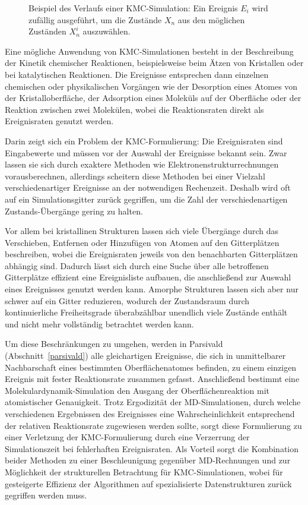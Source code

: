 \begin{figure}
  \centering

  \def\svgwidth{14cm}
  

  \caption[KMC-Baum]{Beispiel des Verlaufs einer KMC-Simulation:
    Ein Ereignis $E_i$ wird zufällig ausgeführt, um die Zustände $X_n$ aus den möglichen Zuständen $X_n^i$ auszuwählen.
  }
  \label{fig:kmctree}
\end{figure}

Eine mögliche Anwendung von KMC-Simulationen besteht in der Beschreibung der Kinetik chemischer Reaktionen, beispielsweise beim Ätzen von Kristallen\cite{gosalvez_atomistic_2008} oder bei katalytischen Reaktionen\cite{stamatakis_unraveling_2012}.
Die Ereignisse entsprechen dann einzelnen chemischen oder physikalischen Vorgängen wie der Desorption eines Atomes von der Kristalloberfläche, der Adsorption eines Moleküls auf der Oberfläche oder der Reaktion zwischen zwei Molekülen, wobei die Reaktionsraten direkt als Ereignisraten genutzt werden.

Darin zeigt sich ein Problem der KMC-Formulierung:
Die Ereignisraten sind Eingabewerte und müssen vor der Auswahl der Ereignisse bekannt sein.
Zwar lassen sie sich durch exaktere Methoden wie Elektronenstrukturrechnungen vorausberechnen, allerdings scheitern diese Methoden bei einer Vielzahl verschiedenartiger Ereignisse an der notwendigen Rechenzeit.
Deshalb wird oft auf ein Simulationsgitter zurück gegriffen, um die Zahl der verschiedenartigen Zustands-Übergänge gering zu halten.

Vor allem bei kristallinen Strukturen lassen sich viele Übergänge durch das Verschieben, Entfernen oder Hinzufügen von Atomen auf den Gitterplätzen beschreiben, wobei die Ereignisraten jeweils von den benachbarten Gitterplätzen abhängig sind.
Dadurch lässt sich durch eine Suche über alle betroffenen Gitterplätze effizient eine Ereignisliste aufbauen, die anschließend zur Auswahl eines Ereignisses genutzt werden kann.
Amorphe Strukturen lassen sich aber nur schwer auf ein Gitter reduzieren, wodurch der Zustandsraum durch kontinuierliche Freiheitsgrade überabzählbar unendlich viele Zustände enthält und nicht mehr vollständig betrachtet werden kann.

Um diese Beschränkungen zu umgehen, werden in Parsivald (Abschnitt~\ref{parsivald}) alle gleichartigen Ereignisse, die sich in unmittelbarer Nachbarschaft eines bestimmten Oberflächenatomes befinden, zu einem einzigen Ereignis mit fester Reaktionsrate zusammen gefasst.
Anschließend bestimmt eine Molekulardynamik-Simulation den Ausgang der Oberflächenreaktion mit atomistischer Genauigkeit.
Trotz Ergodizität der MD-Simulationen, durch welche verschiedenen Ergebnissen des Ereignisses eine Wahrscheinlichkeit entsprechend der relativen Reaktionsrate zugewiesen werden sollte, sorgt diese Formulierung zu einer Verletzung der KMC-Formulierung durch eine Verzerrung der Simulationszeit bei fehlerhaften Ereignisraten.
Als Vorteil sorgt die Kombination beider Methoden zu einer Beschleunigung gegenüber MD-Rechnungen und zur Möglichkeit der strukturellen Betrachtung für KMC-Simulationen, wobei für gesteigerte Effizienz der Algorithmen auf spezialisierte Datenstrukturen zurück gegriffen werden muss.
